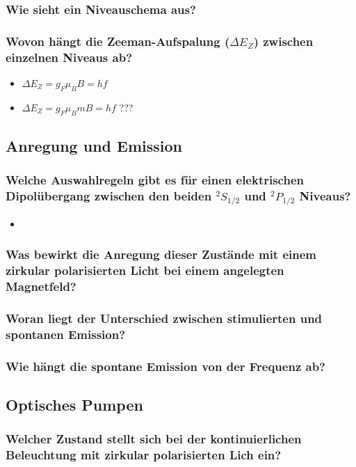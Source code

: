 \subsubsection[]{Wie sieht ein Niveauschema aus?}
\subsubsection[]{Wovon hängt die Zeeman-Aufspalung ($\Delta E_Z$) zwischen einzelnen Niveaus ab?}
\begin{itemize}
    \item $\Delta E_Z=g_F\mu_B B=hf$
    \item $\Delta E_Z=g_F\mu_B m B=hf$ ???
\end{itemize}

\subsection{Anregung und Emission}
\subsubsection[]{Welche Auswahlregeln gibt es für einen elektrischen Dipolübergang zwischen den beiden $^2S_{1/2}$ und $^2P_{1/2}$ Niveaus?}
\begin{itemize}
    \item 
\end{itemize}
\subsubsection[]{Was bewirkt die Anregung dieser Zustände mit einem zirkular polarisierten Licht bei einem angelegten Magnetfeld?}
\subsubsection[]{Woran liegt der Unterschied zwischen stimulierten und spontanen Emission?}
\subsubsection[]{Wie hängt die spontane Emission von der Frequenz ab?}


\subsection{Optisches Pumpen}
\subsubsection[]{Welcher Zustand stellt sich bei der kontinuierlichen Beleuchtung mit zirkular polarisierten Lich ein?}
